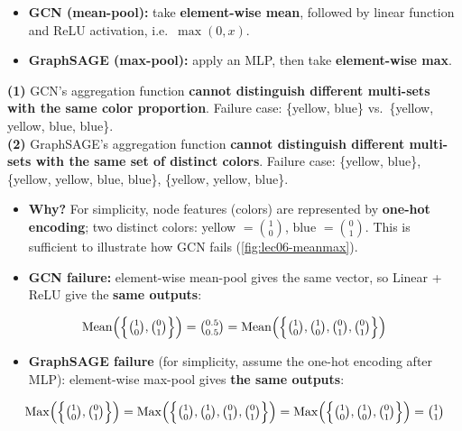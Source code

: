 \begin{itemize}
  \item \textbf{GCN (mean-pool):} take \textbf{element-wise mean}, followed by
    linear function and ReLU activation, i.e.\ $\max(0,x)$.
  \item \textbf{GraphSAGE (max-pool):} apply an MLP, then take \textbf{element-wise
    max}.
\end{itemize}
\begin{proposition}[Xu et al.\ ICLR 2019]\label{prop:lec06-fail}
  \textbf{(1)} GCN's aggregation function \textbf{cannot distinguish different
  multi-sets with the same color proportion}. Failure case: \{yellow, blue\} vs.\
  \{yellow, yellow, blue, blue\}.\\
  \textbf{(2)} GraphSAGE's aggregation function \textbf{cannot distinguish
  different multi-sets with the same set of distinct colors}. Failure case:
  \{yellow, blue\}, \{yellow, yellow, blue, blue\}, \{yellow, yellow, blue\}.
\end{proposition}
\begin{itemize}
  \item \textbf{Why?} For simplicity, node features (colors) are represented by
    \textbf{one-hot encoding}; two distinct colors: yellow $=\binom{1}{0}$, blue
    $=\binom{0}{1}$. This is sufficient to illustrate how GCN fails
    (\cref{fig:lec06-meanmax}).
  \item \textbf{GCN failure:} element-wise mean-pool gives the same vector, so
    Linear + ReLU give the \textbf{same outputs}:
\end{itemize}
\begin{equation}\label{eq:lec06-meanfail}
  \mathrm{Mean}\Big(\Big\{\tbinom{1}{0},\tbinom{0}{1}\Big\}\Big)
  = \tbinom{0.5}{0.5}
  = \mathrm{Mean}\Big(\Big\{\tbinom{1}{0},\tbinom{1}{0},\tbinom{0}{1},\tbinom{0}{1}\Big\}\Big)
\end{equation}
\begin{itemize}
  \item \textbf{GraphSAGE failure} (for simplicity, assume the one-hot encoding
    after MLP): element-wise max-pool gives \textbf{the same outputs}:
\end{itemize}
\begin{equation}\label{eq:lec06-maxfail}
  \mathrm{Max}\Big(\Big\{\tbinom{1}{0},\tbinom{0}{1}\Big\}\Big)
  = \mathrm{Max}\Big(\Big\{\tbinom{1}{0},\tbinom{1}{0},\tbinom{0}{1},\tbinom{0}{1}\Big\}\Big)
  = \mathrm{Max}\Big(\Big\{\tbinom{1}{0},\tbinom{1}{0},\tbinom{0}{1}\Big\}\Big)
  = \tbinom{1}{1}
\end{equation}

